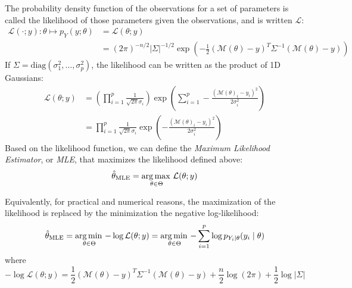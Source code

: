 \documentclass[../../Main_ManuscritThese.tex]{subfiles}
\begin{document}
\begin{definition}
  \label{def:mle}
  The probability density function of the observations for a set of parameters is called the likelihood of those parameters given the observations, and is written $\mathcal{L}$:
  \begin{align}
    \label{eq:likelihood_definition}
    \mathcal{L}(\cdot ;y): \theta \mapsto p_{Y}(y;\theta) &= \mathcal{L}(\theta;y) \\
    &=(2\pi)^{-n/2}\lvert \Sigma \rvert^{-1/2}\exp\left(-\frac{1}{2}(\mathcal{M}(\theta) - y)^T\Sigma^{-1}(\mathcal{M}(\theta) - y)\right)
  \end{align}
  If $\Sigma = \mathrm{diag}(\sigma^2_1,\dots, \sigma^2_p)$, the likelihood can be written as the product of 1D Gaussians:
  \begin{align}
    \mathcal{L}(\theta;y) &= \left(\prod_{i=1}^p\frac{1}{\sqrt{2\pi}\sigma_i}\right)\exp\left(\sum_{i=1}^p -\frac{(\mathcal{M}(\theta)_i - y_i)^2}{2\sigma^2_i}\right) \\
                          &= \prod_{i=1}^p\frac{1}{\sqrt{2\pi}\sigma_i}\exp\left(-\frac{(\mathcal{M}(\theta)_i - y_i)^2}{2\sigma^2_i}\right)
  \end{align}
  Based on the likelihood function, we can define the \emph{Maximum Likelihood Estimator}, or \emph{MLE}, that maximizes the likelihood defined above:
  \begin{equation}
    \label{eq:def_MLE}
    \hat{\theta}_{\mathrm{MLE}} = \operatorname*{arg\,max \,}_{\theta\in\Theta}\mathcal{L}(\theta;y)
  \end{equation}

\end{definition}
  Equivalently, for practical and numerical reasons, the maximization of the likelihood is replaced by the minimization the negative log-likelihood:
  \begin{equation}
    \label{eq:MLE_iid}
    \hat{\theta}_{\mathrm{MLE}} = \operatorname*{arg\,min \,}_{\theta \in \Theta} -\log \mathcal{L}(\theta;y)= \operatorname*{arg\,min \,}_{\theta \in \Theta} -\sum_{i=1}^p\log p_{Y_i\mid \theta}(y_i \mid \theta) 
  \end{equation} 
  where
  \begin{equation}
    -\log\mathcal{L}(\theta;y) = \frac{1}{2}(\mathcal{M}(\theta) - y)^T\Sigma^{-1}(\mathcal{M}(\theta) - y)+  \frac{n}{2}\log(2\pi) + \frac{1}{2}\log\lvert \Sigma \rvert
  \end{equation}
\end{document}

